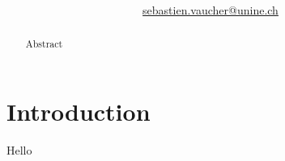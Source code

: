 \documentclass[11pt,a4paper,bibliography=totocnumbered]{scrartcl}
\author{\myauthor\\ \href{mailto:sebastien.vaucher@unine.ch}{sebastien.vaucher@unine.ch}}
\title{\huge \textbf{\mytitle}}
\begin{document}
\nocite{*}

\begin{titlingpage}

\begin{otherlanguage}{australian}
\maketitle
\end{otherlanguage}

\begin{abstract}
Abstract
\end{abstract}

\begin{figure}[b]
\centering
{}
\qquad
{}
\end{figure}

\end{titlingpage}

\pagebreak

\setcounter{tocdepth}{2}
\tableofcontents

\pagebreak

\section{Introduction}

Hello

\begin{otherlanguage}{australian}
\printbibliography
\end{otherlanguage}
\end{document}
